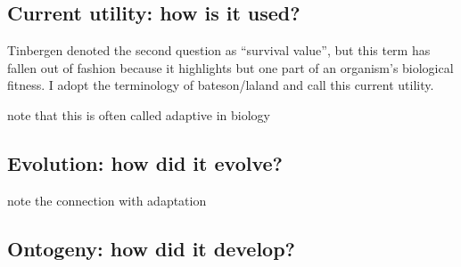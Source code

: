 \documentclass{article}
\begin{document}
\subsection{Current utility: how is it used?}

Tinbergen denoted the second question as ``survival value'', but this term has fallen out of fashion because it highlights but one part of an organism's biological fitness.
I adopt the terminology of bateson/laland and call this current utility.

note that this is often called adaptive in biology

\subsection{Evolution: how did it evolve?}
\label{sec:evolution:-how-did}

note the connection with adaptation

\subsection{Ontogeny: how did it develop?}
\label{sec:ontogeny:-how-did}







\end{document}
